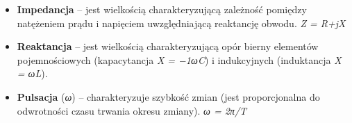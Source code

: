 \begin{itemize}
	\item \textbf{Impedancja} – jest wielkością charakteryzującą zależność pomiędzy natężeniem prądu i napięciem uwzględniającą reaktancję obwodu. \textit{Z = R+jX}
    \item \textbf{Reaktancja} – jest wielkością charakteryzującą opór bierny elementów pojemnościowych (kapacytancja \textit{X = −1ωC}) i indukcyjnych (induktancja \textit{X = ωL}).
    \item \textbf{Pulsacja} (\textit{ω}) – charakteryzuje szybkość zmian (jest proporcjonalna do odwrotności czasu trwania okresu zmiany). \textit{ω = 2π/T}
\end{itemize}

